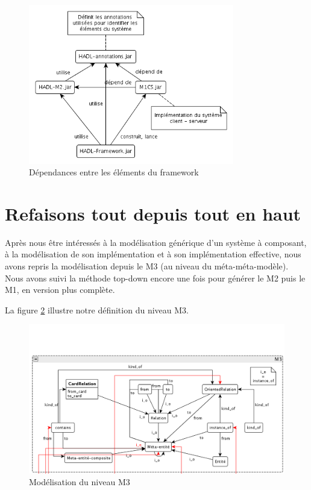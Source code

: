 \documentclass[french,a4paper,titlepage]{article}
\begin{document}
		\begin{figure}[htb]
			\centering
			\includegraphics[width=0.8\textwidth]{./framework.png}
			\caption{Dépendances entre les éléments du framework}
			\label{fig:framework}
		\end{figure}
	
	
	\section{Refaisons tout depuis tout en haut}
	
		Après nous être intéressés à la modélisation générique d'un système à composant, à la modélisation de son implémentation et à son implémentation effective, nous avons repris la modélisation depuis le M3 (au niveau du méta-méta-modèle). Nous avons suivi la méthode top-down encore une fois pour générer le M2 puis le M1, en version plus complète.
		
		La figure \ref{fig:M3} illustre notre définition du niveau M3.
		
		\begin{figure}[htb]
			\centering
			\includegraphics[width=\textwidth]{m3.png}
			\caption{Modélisation du niveau M3}
			\label{fig:M3}
		\end{figure}
		
\end{document}
